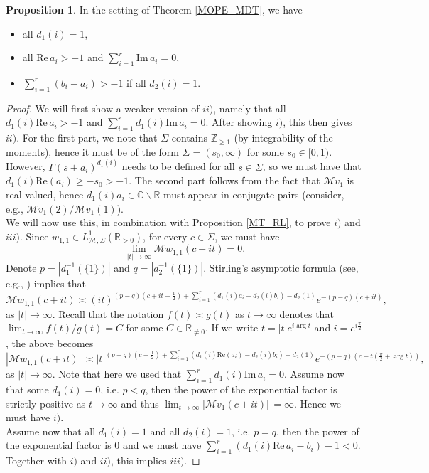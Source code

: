 \documentclass[a4paper,12pt,oneside]{article}
\theoremstyle{definition}
\newtheorem{prop}[defi]{Proposition}
\newcommand{\Z}{\mathbb{Z}}
\newcommand{\C}{\mathbb{C}}
\newcommand{\R}{\mathbb{R}}
\newcommand{\MT}[1]{\mathcal{M}#1}
\begin{document}
\begin{prop} \label{MDT_COND}
In the setting of Theorem \ref{MOPE_MDT}, we have
\begin{itemize}
    \item[$i)$] all $d_1(i)=1$, 
    \item[$ii)$] all $\text{Re}\,a_i>-1$ and $\sum_{i=1}^{r} \text{Im}\,a_i=0$, 
    \item[$iii)$] $\sum_{i=1}^r (b_i-a_i) > - 1$ if all $d_2(i)=1$.
\end{itemize}
\end{prop}
\begin{proof}
    We will first show a weaker version of $ii)$, namely that all $d_1(i) \text{Re}\,a_i>-1$ and $\sum_{i=1}^{r} d_1(i) \text{Im}\,a_i=0$. After showing $i)$, this then gives $ii)$. For the first part, we note that $\Sigma$ contains $\Z_{\geq 1}$ (by integrability of the moments), hence it must be of the form $\Sigma=(s_0,\infty)$ for some $s_0\in[0,1)$. However, $\Gamma(s+a_i)^{d_1(i)}$ needs to be defined for all $s\in\Sigma$, so we must have that $d_1(i)\text{Re}(a_i)\geq -s_0>-1$. The second part follows from the fact that $\MT{v_1}$ is real-valued, hence $d_1(i) a_i\in\C\backslash\R$ must appear in conjugate pairs (consider, e.g., $\MT{v_1}(2)/\MT{v_1}(1)$).  \\    
    We will now use this, in combination with Proposition \ref{MT_RL}, to prove $i)$ and $iii)$. Since $w_{1,1}\in L^1_{\MT{},\Sigma}(\R_{>0})$, for every $c\in\Sigma$, we must have
        $$ \lim_{|t|\to\infty} \MT{w_{1,1}}(c+it) = 0. $$
    Denote $p=|d_1^{-1}(\{1\})|$ and $q=|d_2^{-1}(\{1\})|$. Stirling's asymptotic formula (see, e.g., \cite[Eq. 5.11.7]{DLMF}) implies that
        $$ \MT{w_{1,1}}(c+it) \asymp (it)^{(p-q)(c+it-\frac{1}{2})+\sum_{i=1}^r (d_1(i) a_i-d_2(i) b_i)-d_2(1)} e^{-(p-q)(c+it)} , $$
    as $|t|\to\infty$. Recall that the notation $f(t)\asymp g(t)$ as $t\to\infty$ denotes that $\lim_{t\to\infty} f(t)/g(t) = C$ for some $C\in\R_{\neq 0}$. If we write $t=|t| e^{i\arg t}$ and $i=e^{i\frac{\pi}{2}}$, the above becomes
    $$ |\MT{w_{1,1}}(c+it)|\, \asymp |t|^{(p-q)(c-\frac{1}{2})+\sum_{i=1}^r (d_1(i) \text{Re}(a_i)- d_2(i) b_i) -d_2(1)} e^{-(p-q)(c+t(\frac{\pi}{2}+\arg t))}, $$
    as $|t|\to\infty$. Note that here we used that $\sum_{i=1}^r d_1(i) \text{Im}\,a_i=0$. Assume now that some $d_1(i)=0$, i.e. $p<q$, then the power of the exponential factor is strictly positive as $t\to\infty$ and thus $\lim_{t\to\infty}|\MT{v_1}(c+it)|\, = \infty$. Hence we must have $i)$.\\
    Assume now that all $d_1(i)=1$ and all $d_2(i)=1$, i.e. $p=q$, then the power of the exponential factor is $0$ and we must have $\sum_{i=1}^r (d_1(i) \text{Re}\,a_i-b_i) - 1 < 0$. Together with $i)$ and $ii)$, this implies $iii)$.
\end{proof}
\end{document}
